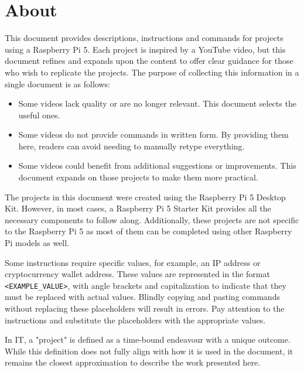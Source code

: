 \section*{About}  

This document provides descriptions, instructions and commands for projects using a Raspberry Pi 5. Each project is inspired by a YouTube video, but this document refines and expands upon the content to offer clear guidance for those who wish to replicate the projects. The purpose of collecting this information in a single document is as follows:

\begin{itemize}
\item Some videos lack quality or are no longer relevant. This document selects the useful ones.
\item Some videos do not provide commands in written form. By providing them here, readers can avoid needing to manually retype everything.
\item Some videos could benefit from additional suggestions or improvements. This document expands on those projects to make them more practical.
\end{itemize}

The projects in this document were created using the Raspberry Pi 5 Desktop Kit. However, in most cases, a Raspberry Pi 5 Starter Kit provides all the necessary components to follow along. Additionally, these projects are not specific to the Raspberry Pi 5 as most of them can be completed using other Raspberry Pi models as well.  

Some instructions require specific values, for example, an IP address or cryptocurrency wallet address. These values are represented in the format \texttt{\textless EXAMPLE\_VALUE\textgreater}, with angle brackets and capitalization to indicate that they must be replaced with actual values. Blindly copying and pasting commands without replacing these placeholders will result in errors. Pay attention to the instructions and substitute the placeholders with the appropriate values.

In IT, a "project" is defined as a time-bound endeavour with a unique outcome. While this definition does not fully align with how it is used in the document, it remains the closest approximation to describe the work presented here.